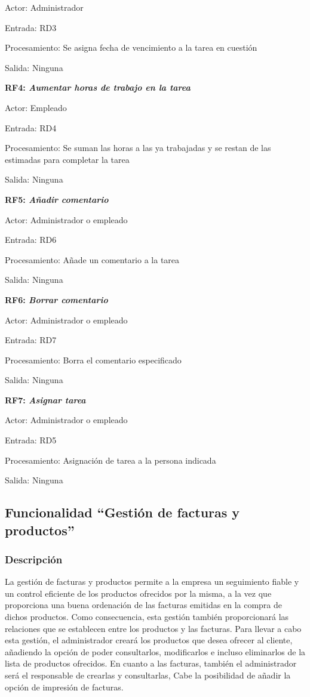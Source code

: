 \documentclass[paper=a4, fontsize=11pt, spanish]{scrartcl}
\begin{document}
Actor: Administrador

Entrada: RD3

Procesamiento: Se asigna fecha de vencimiento a la tarea en cuestión

Salida: Ninguna

\setlength{\parindent}{0em}
\textbf{RF4: \textit{Aumentar horas de trabajo en la tarea}}
\setlength{\parindent}{2em}

Actor: Empleado

Entrada: RD4

Procesamiento: Se suman las horas a las ya trabajadas y se restan de las estimadas para completar la tarea

Salida: Ninguna

\setlength{\parindent}{0em}
\textbf{RF5: \textit{Añadir comentario}}
\setlength{\parindent}{2em}

Actor: Administrador o empleado

Entrada: RD6

Procesamiento: Añade un comentario a la tarea

Salida: Ninguna

\setlength{\parindent}{0em}
\textbf{RF6: \textit{Borrar comentario}}
\setlength{\parindent}{2em}

Actor: Administrador o empleado

Entrada: RD7

Procesamiento: Borra el comentario especificado

Salida: Ninguna

\setlength{\parindent}{0em}
\textbf{RF7: \textit{Asignar tarea}}
\setlength{\parindent}{2em}

Actor: Administrador o empleado

Entrada: RD5

Procesamiento: Asignación de tarea a la persona indicada

Salida: Ninguna

\subsection{Funcionalidad “Gestión de facturas y productos”}

\subsubsection{Descripción}
\setlength{\parindent}{3em} La gestión de facturas y productos permite a la empresa un seguimiento fiable y un control eficiente de los productos ofrecidos por la misma, a la vez que proporciona una buena ordenación de las facturas emitidas en la compra de dichos productos. Como consecuencia, esta gestión también proporcionará las relaciones que se establecen entre los productos y las facturas.
Para llevar a cabo esta gestión, el administrador creará los productos que desea ofrecer al cliente, añadiendo la opción de poder consultarlos, modificarlos e incluso eliminarlos de la lista de productos ofrecidos. En cuanto a las facturas, también el administrador será el responsable de crearlas y consultarlas, Cabe la posibilidad de añadir la opción de impresión de facturas.
\end{document}
